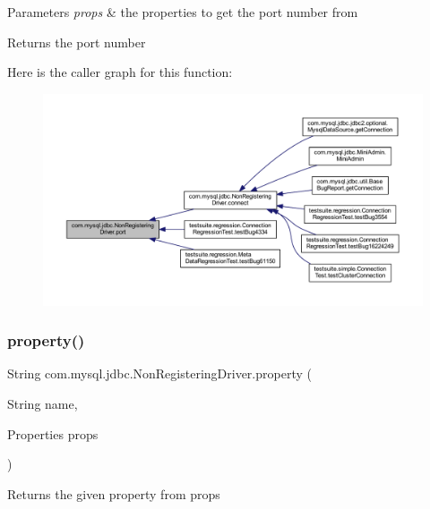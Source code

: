 \begin{DoxyParams}{Parameters}
{\em props} & the properties to get the port number from\\
\hline
\end{DoxyParams}
\begin{DoxyReturn}{Returns}
the port number 
\end{DoxyReturn}
Here is the caller graph for this function\+:
\nopagebreak
\begin{figure}[H]
\begin{center}
\leavevmode
\includegraphics[width=350pt]{classcom_1_1mysql_1_1jdbc_1_1_non_registering_driver_a90edfd44b2f276ac386d4ab31c76ace6_icgraph}
\end{center}
\end{figure}
\mbox{\label{classcom_1_1mysql_1_1jdbc_1_1_non_registering_driver_a62d32f3556978d8c7a9f2702b44c8c82}} 
\subsubsection{\texorpdfstring{property()}{property()}}
{\footnotesize\ttfamily String com.\+mysql.\+jdbc.\+Non\+Registering\+Driver.\+property (\begin{DoxyParamCaption}\item[{String}]{name,  }\item[{Properties}]{props }\end{DoxyParamCaption})}

Returns the given property from {\ttfamily props}


